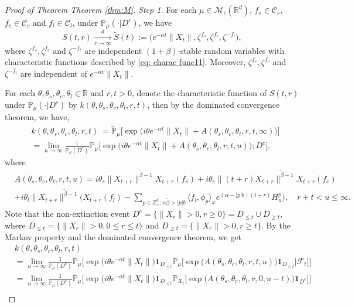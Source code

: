 \documentclass[12pt,a4paper]{amsart}
\theoremstyle{plain}
\theoremstyle{definition}
\numberwithin{equation}{section}
\begin{document}
\begin{proof}[Proof of Theorem Theorem \ref{thm:M}]
\emph{Step 1.} For each $\mu\in \mathcal M_c(\mathbb R^d)$, $f_s\in \mathcal C_s$,$f_c\in \mathcal C_c$ and $f_l\in \mathcal C_l$, under $\mathbb P_{\mu}(\cdot|D^c)$, we have
\[
S(t,r)\xrightarrow[r\rightarrow \infty]{d}\widetilde{S}(t):=\Big(e^{-\alpha t}\|X_t\|,\zeta^{f_s},\zeta^{f_c},\zeta^{-f_l}\Big),
\]
where $\zeta^{f_s},\zeta^{f_c}$ and $\zeta^{-f_l}$ are independent $(1+\beta)$-stable random variables with characteristic functions described by \eqref{eq: charac func11}. Moreover,  $\zeta^{f_s},\zeta^{f_c}$ and $\zeta^{-f_l}$ are independent of $e^{-\alpha t}\|X_t\|$.

For each $\theta,\theta_s,\theta_c,\theta_l\in \mathbb R$ and $r,t>0$, denote the characteristic function of  $S(t,r)$ under $\mathbb P_{\mu}(\cdot|D^c)$ by $k(\theta,\theta_s,\theta_c,\theta_l,r,t)$, then by the dominated convergence theorem, we have,
\begin{align}
   &k(\theta,\theta_s,\theta_c,\theta_l,r,t)\
   =\widetilde{\mathbb P}_{\mu}\Big[\exp\Big( i\theta e^{-\alpha t}\|X_t\|+A(\theta_s,\theta_c,\theta_l,r,t,\infty)\Big)\Big]\\
  &=\lim_{u\rightarrow \infty}\frac{1}{\mathbb P_{\mu}(D^c)}\mathbb P_{\mu}\Big[\exp\Big( i\theta e^{-\alpha t}\|X_t\|+A(\theta_s,\theta_c,\theta_l,r,t,u)\Big);D^c\Big],
\end{align}
where
\begin{align}
 &A(\theta_s,\theta_c,\theta_l,r,t,u)=i\theta_s\|X_{t+r}\|^{\tilde{\beta}-1}X_{t+r}(f_s)+ i\theta_c \|(t+r)X_{t+r}\|^{\tilde{\beta}-1}X_{t+r}(f_c)\\
&+i\theta_l \|X_{t+r}\|^{\tilde{\beta}-1}\Big(X_{t+r}(f_l)-\sum_{p\in \mathbb Z_+^d:\alpha\tilde{\beta}>|p|b}\langle f_l,\phi_p\rangle_{\varphi}e^{(\alpha-|p|b)(t+r)}H_{u}^p\Big),\quad r+t<u\leq \infty.
\end{align}
Note that the non-extinction event $D^c=\{\|X_r\|>0, r\geq 0\}=D_{\leq t}\cup D_{\geq t}$, where $D_{\leq t}=\{\|X_r\|>0, 0\leq r\leq t\}$ and $D_{\geq t}=\{\|X_r\|>0, r\geq t\}$. By the Markov property and the dominated convergence theorem, we get
\begin{align}
  & k(\theta,\theta_s,\theta_c,\theta_l,r,t)\\
&=\lim_{u\rightarrow \infty}\frac{1}{\mathbb P_{\mu}(D^c)}\mathbb P_{\mu}\Big[\exp\Big(i\theta e^{-\alpha t}\|X_t\|\Big)\mathbf 1_{D_{\leq t}} \mathbb P_{\mu}\Big[\exp\Big(A(\theta_s,\theta_c,\theta_l,r,t,u)\Big)\mathbf 1_{D_{\geq t}}\Big|\mathscr F_t\Big]\Big]\\
&=\lim_{u\rightarrow\infty}\frac{1}{\mathbb P_{\mu}(D^c)}\mathbb P_{\mu}\Big[\exp\Big( i\theta e^{-\alpha t}\|X_t\|\Big)\mathbf 1_{D_{\leq t}}\mathbb P_{X_t}\Big[\exp\Big(A(\theta_s,\theta_c,\theta_l,r,0,u-t)\Big)\mathbf 1_{D^c}\Big]\Big]\\

\end{align}
\end{proof}
\end{document}
